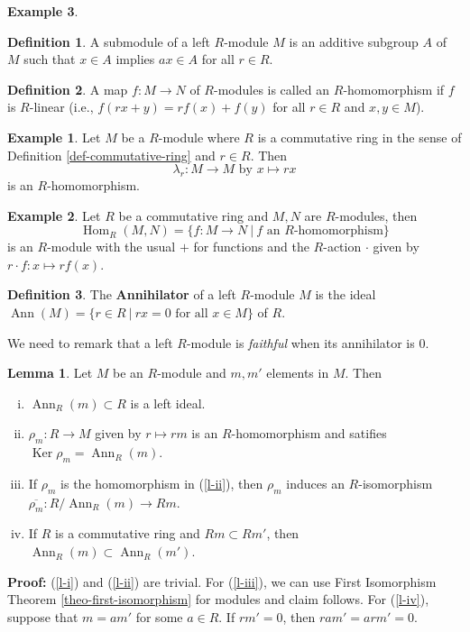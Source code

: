\documentclass[11pt]{amsbook}%
\newcommand{\ii}{\item}
\theoremstyle{plain}
\theoremstyle{definition}
\newtheorem{definition*}{Definition}
\newtheorem*{example*}{Example}
\newtheorem{lemma}{Lemma}
\numberwithin{equation}{section}
\renewcommand{\proof}{ \textbf{Proof: }}
\DeclareMathOperator{\Ann}{Ann}
\DeclareMathOperator{\Hom}{Hom}
\DeclareMathOperator{\Ker}{Ker}
\begin{document}
\begin{example*}
\begin{definition*}
  A submodule of a left $R$-module $M$ is an additive subgroup $A$ of $M$ such that
  $x \in A$ implies $ax \in A$ for all $r \in R$.
\end{definition*}

\begin{definition*}
  \label{def-homomorhism-module}
  A map $f: M \longrightarrow N$ of $R$-modules is called an $R$-homomorphism if $f$ is $R$-linear
  (i.e., $f(rx + y) = rf(x) + f(y)$ for all $r \in R$ and $x, y \in M$).
\end{definition*}

\begin{example*}
  Let $M$ be a $R$-module where $R$ is a commutative ring in the sense of Definition \ref{def-commutative-ring} and $r \in R$.
  Then
  $$
  \lambda_{r}: M \longrightarrow M \text{ by } x \mapsto rx
  $$
  is an $R$-homomorphism.
\end{example*}

\begin{example*}
  Let $R$ be a commutative ring and $M, N$ are $R$-modules, then
  $$
  \Hom_{R}(M, N) = \{f: M \longrightarrow N \ | \ f \text{ an } R\text{-homomorphism} \}
  $$
  is an $R$-module with the usual $+$ for functions and the $R$-action $\cdot$ given by $r \cdot f: x \mapsto rf(x)$.
\end{example*}

\begin{definition*}
  \label{def-annihilator}
  The \textbf{Annihilator} of a left $R$-module $M$ is the ideal $\Ann(M) = \{r \in R \ | \ rx = 0 \text{ for all } x \in M \}$
  of $R$.
\end{definition*}
We need to remark that a left $R$-module is \textit{faithful} when its annihilator is 0.

\begin{lemma}
  \label{lemm-properties-ann}
  Let $M$ be an $R$-module and $m, m'$ elements in $M$. Then
  \begin{enumerate}[(i) ]
      \ii \label{l-i} $\Ann_{R}(m) \subset R$ is a left ideal.
      \ii \label{l-ii}$ \rho_{m}: R \longrightarrow M$ given by $r \mapsto rm$ is an $R$-homomorphism and satifies $\Ker \rho_{m} = \Ann_{R}(m)$.
      \ii \label{l-iii} If $\rho_{m}$ is the homomorphism in (\ref{l-ii}), then $\rho_{m}$ induces an $R$-isomorphism $\overline{\rho_{m}}: R/\Ann_{R}(m) \longrightarrow Rm$.
      \ii \label{l-iv} If $R$ is a commutative ring and $Rm \subset Rm'$, then $\Ann_{R}(m) \subset \Ann_{R}(m')$.
  \end{enumerate}
\end{lemma} \vspace{1.8em}
\proof (\ref{l-i}) and (\ref{l-ii}) are trivial. For (\ref{l-iii}), we can use First Isomorphism Theorem \ref{theo-first-isomorphism}
for modules and claim follows. For (\ref{l-iv}), suppose that $m = am'$ for some $a \in R$. If $rm' = 0$, then
$ram' = arm' = 0$. \qedsymbol


\end{example*}
\end{document}
